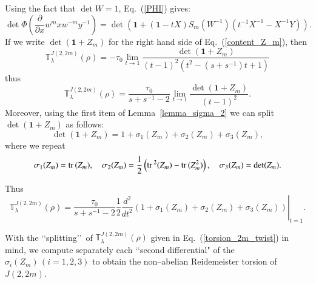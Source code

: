 \documentclass[a4paper]{amsart}
\theoremstyle{plain}
\theoremstyle{definition}
\theoremstyle{remark}
\newcommand{\I}{\mathbf{1}}
\newcommand{\trace}{{\rm tr}\,}
\begin{document}
Using the fact that $\det W =1$, Eq.~(\ref{PHI}) gives:
\begin{equation}
\det \Phi(\frac{\partial}{\partial x}w^m  x w^{-m} y^{-1})
=
\det \left(\I +(\I -tX)S_m(W^{-1})(t^{-1} X^{-1} - X^{-1}Y) \right).
\label{content_Z_m}
\end{equation}
If we write $\det(\I + Z_m)$ for
the right hand side of Eq.~(\ref{content_Z_m}),
then 
\begin{equation}\label{Tlim}
{\mathbb T}^{J(2, 2m)}_{\lambda}(\rho) = 
-\tau_0
\lim_{t \to 1}
\frac{\det(\I+Z_m)}{(t-1)^2(t^2 - (s+s^{-1})t+1)}
\end{equation}
thus
\[{\mathbb T}^{J(2, 2m)}_{\lambda}(\rho)  =
\frac{\tau_0}{s+s^{-1} - 2}
\lim_{t \to 1}
\frac{\det(\I+Z_m)}{(t-1)^2}.
\] 
{Moreover, using the first item of Lemma~\ref{lemma_sigma_2}}  we can split $\det(\I+Z_m)$ as follows: 
\begin{equation}\label{split}
\det(\I + Z_m)
=1 + \sigma_1(Z_m) + \sigma_2(Z_m) + \sigma_3(Z_m),
\end{equation}
where we repeat
\[
\sigma_1(Z_m) = \trace(Z_m), \quad
\sigma_2(Z_m) = \frac{1}{2} \left( \trace^2(Z_m)-\trace(Z_m^2)\right),\quad
\sigma_3(Z_m) = \det(Z_m).
\]


Thus
\begin{equation}\label{torsion_2m_twist}
{\mathbb T}^{J(2, 2m)}_{\lambda}(\rho)
=
\frac{\tau_0}{s+s^{-1}-2}
\left.{
    \frac{1}{2} 
    \frac{d^2}{dt^2}
        \left( 
            1 + \sigma_1(Z_m) + \sigma_2(Z_m) + \sigma_3(Z_m)
        \right)
    }\right|_{t=1}.
\end{equation}

With the \lq\lq splitting\rq\rq\, of  ${\mathbb T}^{J(2, 2m)}_{\lambda}(\rho)$ given in Eq.~(\ref{torsion_2m_twist}) in mind, we compute separately each \lq\lq second differential" of the $\sigma_i(Z_m)\,(i=1,2,3)$ to obtain the non--abelian Reidemeister torsion of $J(2, 2m)$.
\medskip
\end{document}
